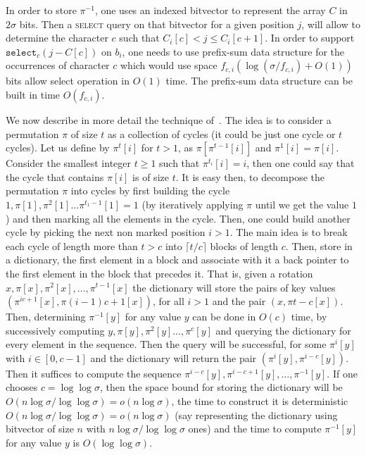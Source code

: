 \documentclass[a4paper]{article}
\begin{document}
In order to store $\pi^{-1}$, one uses an indexed bitvector to represent the array $C$
in $2\sigma$ bits. Then a \textsc{select} query on that bitvector for a given position
$j$, will allow to determine the character $c$ such that $C_i[c]<j\leq C_i[c+1]$.
In order to support $\mathtt{select}_{c}(j-C[c])$ on $b_i$, one needs 
to use prefix-sum data structure for the occurrences of character 
$c$ which would use space $f_{c,i}(\log (\sigma/f_{c,i})+O(1))$ bits allow 
select operation in $O(1)$ time. The prefix-sum data structure can be built 
in time $O(f_{c,i})$. 

We now describe in more detail the technique 
of~\cite{munro2003succinct}. The idea is to consider 
a permutation $\pi$ of size $t$ as a collection of cycles
(it could be just one cycle or $t$ cycles). Let us 
define by $\pi^t[i]$ for $t>1$, as $\pi[\pi^{t-1}[i]]$ 
and $\pi^1[i]=\pi[i]$. 
Consider the smallest integer $t\geq 1$ such that 
$\pi^{t_i}[i]=i$, then one could say that the cycle that
contains $\pi[i]$ is of size $t$. It is easy then, to 
decompose the permutation $\pi$ into cycles by first 
building the cycle $1,\pi[1],\pi^2[1]\ldots \pi^{t_1-1}[1]=1$ 
(by iteratively applying $\pi$ until we get the value $1$) 
and then marking all the elements in the cycle. Then, one could 
build another cycle by picking the next non marked position $i>1$. 
The main idea is to break each cycle of length more than $t>c$ into 
$\lceil t/c\rceil$ blocks of length $c$. Then, store in a dictionary, 
the first element in a block and associate with it a back pointer 
to the first element in the block that precedes it. 
That is, given a rotation $x,\pi[x],\pi^2[x],\ldots,\pi^{t-1}[x]$ 
the dictionary will store the pairs of key values $(\pi^{ic+1}[x],\pi{(i-1)c+1}[x])$, 
for all $i>1$ and the pair $(x,\pi{t-c}[x])$. Then, determining $\pi^{-1}[y]$ for any value $y$
can be done in $O(c)$ time, by successively computing $y,\pi[y],\pi^{2}[y]\ldots,\pi^{c}[y]$ and querying 
the dictionary for every element in the sequence. Then the query will be successful, for some 
$\pi^{i}[y]$ with $i\in[0,c-1]$ and the dictionary will return the pair $(\pi^{i}[y],\pi^{i-c}[y])$. 
Then it suffices to compute the sequence $\pi^{i-c}[y],\pi^{i-c+1}[y],\ldots,\pi^{-1}[y]$.
If one chooses $c=\log\log\sigma$, then the space bound for storing 
the dictionary will be $O(n\log\sigma/\log\log\sigma)=o(n\log\sigma)$, the time 
to construct it is deterministic $O(n\log\sigma/\log\log\sigma)=o(n\log\sigma)$
(say representing the dictionary using bitvector of size $n$ with $n\log\sigma/\log\log\sigma$
ones) and the time to compute $\pi^{-1}[y]$ for any value $y$ is $O(\log\log\sigma)$. 
\end{document}
